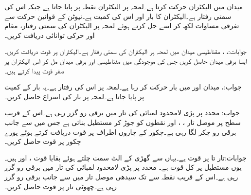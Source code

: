 \newpage
{}
میدان  میں الیکٹران  حرکت کرتا ہے۔لمحہ  پر الیکٹران نقطہ  پر پایا جاتا ہے جبکہ اس کی سمتی رفتار  ہے۔الیکٹران کا بار  اور اس کی کمیت  ہے۔نیوٹن کے قوانین حرکت سے تفرقی مساوات لکھ کر اسے حل کرتے ہوئے لمحہ  پر الیکٹران کی سمتی رفتار، مقام اور حرکی توانائی دریافت کریں۔

جوابات:، ، 
مقناطیسی میدان  میں لمحہ  پر الیکٹران کی سمتی رفتار  ہے۔الیکٹران پر قوت دریافت کریں۔ایسا برقی میدان حاصل کریں جس کی موجودگی میں مقناطیسی اور برقی میدان مل کر اس الیکٹران پر صفر قوت  پیدا کرتے ہیں۔

جواب:، 
میدان  اور  میں بار  حرکت کر رہا ہے۔لمحہ  پر اس کی رفتار  ہے۔یہ بار  کے کمیت پر پایا جاتا ہے۔لمحہ  پر بار کی اسراع حاصل کریں۔

جواب:
محدد  پر پڑی لامحدود لمبائی کی تار میں  برقی رو گزر رہی ہے۔اس کے قریب سطح  پر موصل تار ، ،  اور  نقطوں کو جوڑ کر مستطیل بناتی ہے جس میں  سے  جانب  برقی رو چکر  لگا رہی ہے۔چکور کے چاروں اطراف پر قوت دریافت کرتے ہوئے پورے چکور پر قوت حاصل کریں۔

جوابات:تار  تا  پر قوت  ہے۔یہاں سے گھڑی کے الٹ سمت چلتے ہوئے بقایا قوت  ،  اور  ہیں۔یوں مستطیل پر کل قوت  ہے۔
محدد  پر پڑی لامحدود لمبائی کی تار میں  برقی رو گزر رہی ہے۔اس کے قریب نقطہ  سے  تک سیدھی موصل تار میں  سے  جانب  برقی رو گزر رہی ہے۔چھوٹی تار پر قوت حاصل کریں۔

